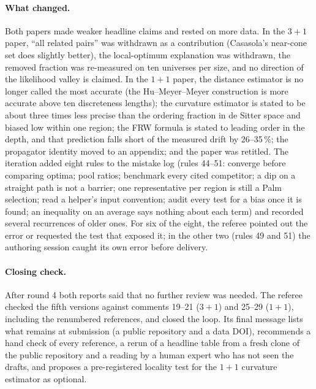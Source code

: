 \documentclass[11pt,a4paper]{article}
\begin{document}
\paragraph{What changed.} Both papers made weaker headline claims and rested on more data. In the $3+1$ paper, ``all related pairs'' was withdrawn as a contribution (Casasola's near-cone set does slightly better), the local-optimum explanation was withdrawn, the removed fraction was re-measured on ten universes per size, and no direction of the likelihood valley is claimed. In the $1+1$ paper, the distance estimator is no longer called the most accurate (the Hu--Meyer--Meyer construction is more accurate above ten discreteness lengths); the curvature estimator is stated to be about three times less precise than the ordering fraction in de Sitter space and biased low within one region; the FRW formula is stated to leading order in the depth, and that prediction falls short of the measured drift by 26--35\,\%; the propagator identity moved to an appendix; and the paper was retitled. The iteration added eight rules to the mistake log (rules 44--51: converge before comparing optima; pool ratios; benchmark every cited competitor; a dip on a straight path is not a barrier; one representative per region is still a Palm selection; read a helper's input convention; audit every test for a bias once it is found; an inequality on an average says nothing about each term) and recorded several recurrences of older ones. For six of the eight, the referee pointed out the error or requested the test that exposed it; in the other two (rules 49 and 51) the authoring session caught its own error before delivery.

\paragraph{Closing check.} After round 4 both reports said that no further review was needed. The referee checked the fifth versions against comments 19--21 ($3+1$) and 25--29 ($1+1$), including the renumbered references, and closed the loop. Its final message lists what remains at submission (a public repository and a data DOI), recommends a hand check of every reference, a rerun of a headline table from a fresh clone of the public repository and a reading by a human expert who has not seen the drafts, and proposes a pre-registered locality test for the $1+1$ curvature estimator as optional.
\end{document}
